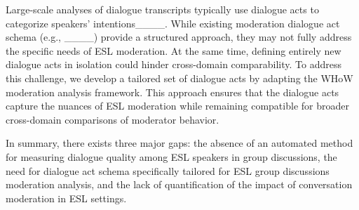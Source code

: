 Large-scale analyses of dialogue transcripts typically use dialogue acts to categorize speakers' intentions____. While existing moderation dialogue act schema (e.g., ____) provide a structured approach, they may not fully address the specific needs of ESL moderation. At the same time, defining entirely new dialogue acts in isolation could hinder cross-domain comparability. To address this challenge, we develop a tailored set of dialogue acts by adapting the WHoW moderation analysis framework. This approach ensures that the dialogue acts capture the nuances of ESL moderation while remaining compatible for broader cross-domain comparisons of moderator behavior.


In summary, there exists three major gaps: the absence of an automated method for measuring dialogue quality among ESL speakers in group discussions, the need for dialogue act schema specifically tailored for ESL group discussions moderation analysis, and the lack of quantification of the impact of conversation moderation in ESL settings.